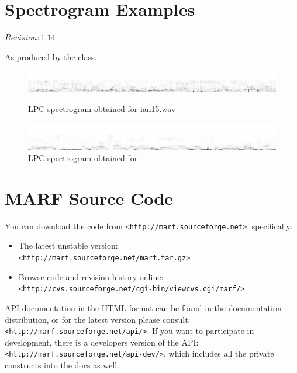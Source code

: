 \appendix

\chapter{Spectrogram Examples}
\label{appx:spectra}

$Revision: 1.14 $

As produced by the  class.

\begin{figure}[h]
	\centering
	\includegraphics[width=500pt]{../graphics/lpc_spectrograms/ian15_wav.png}
	\caption{LPC spectrogram obtained for ian15.wav}
	\includegraphics[width=500pt]{../graphics/lpc_spectrograms/graham13_wav.png}
	\caption{LPC spectrogram obtained for }
\end{figure}


\chapter{MARF Source Code}

You can download
the code from \verb+<http://marf.sourceforge.net>+, specifically:

\begin{itemize}
	\item The latest unstable version:\\\verb+<http://marf.sourceforge.net/marf.tar.gz>+
	\item Browse code and revision history online:\\\verb+<http://cvs.sourceforge.net/cgi-bin/viewcvs.cgi/marf/>+
\end{itemize}

API documentation in the HTML format can be found in the documentation
distribution, or for the latest version please consult:
\verb+<http://marf.sourceforge.net/api/>+. If you want to participate
in development, there is a developers version of the API:
\verb+<http://marf.sourceforge.net/api-dev/>+, which includes
all the private constructs into the docs as well.

